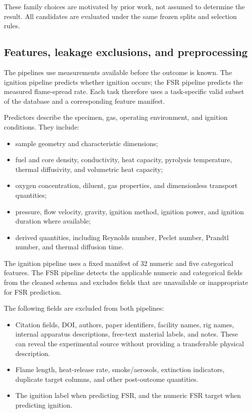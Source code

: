 These family choices are motivated by prior work, not assumed to determine the
result. All candidates are evaluated under the same frozen splits and selection
rules.

\subsection{Features, leakage exclusions, and preprocessing}

The pipelines use measurements available before the outcome is known. The
ignition pipeline predicts whether ignition occurs; the FSR pipeline predicts
the measured flame-spread rate. Each task therefore uses a task-specific valid
subset of the database and a corresponding feature manifest.

Predictors describe the specimen, gas, operating environment, and ignition
conditions. They include:

\begin{itemize}
  \item sample geometry and characteristic dimensions;
  \item fuel and core density, conductivity, heat capacity, pyrolysis
  temperature, thermal diffusivity, and volumetric heat capacity;
  \item oxygen concentration, diluent, gas properties, and dimensionless
  transport quantities;
  \item pressure, flow velocity, gravity, ignition method, ignition power, and
  ignition duration where available;
  \item derived quantities, including Reynolds number, Peclet number, Prandtl
  number, and thermal diffusion time.
\end{itemize}

The ignition pipeline uses a fixed manifest of 32 numeric and five categorical
features. The FSR pipeline detects the applicable numeric and categorical
fields from the cleaned schema and excludes fields that are unavailable or
inappropriate for FSR prediction.

The following fields are excluded from both pipelines:

\begin{itemize}
  \item Citation fields, DOI, authors, paper identifiers, facility names, rig
  names, internal apparatus descriptions, free-text material labels, and notes.
  These can reveal the experimental source without providing a transferable
  physical description.

  \item Flame length, heat-release rate, smoke/aerosols, extinction indicators,
  duplicate target columns, and other post-outcome quantities.

  \item The ignition label when predicting FSR, and the numeric FSR target when
  predicting ignition.
\end{itemize}

